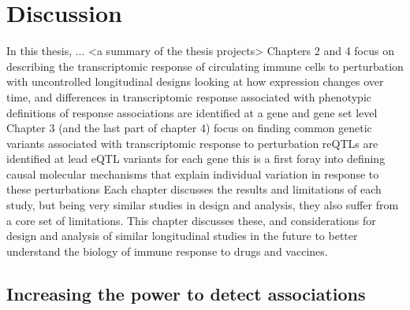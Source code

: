 %
%

\chapter{Discussion}
\label{ch:discussion}


\begin{outline}

\1 In this thesis, ... <a summary of the thesis projects>
    \2 Chapters 2 and 4 focus on describing the transcriptomic response of circulating immune cells to perturbation with uncontrolled longitudinal designs
        \3 looking at how expression changes over time, and differences in transcriptomic response associated with phenotypic definitions of response
        \3 associations are identified at a gene and gene set level
    \2 Chapter 3 (and the last part of chapter 4) focus on finding common genetic variants associated with transcriptomic response to perturbation
        \3 reQTLs are identified at lead eQTL variants for each gene
        \3 this is a first foray into defining causal molecular mechanisms that explain individual variation in response to these perturbations
    \2 Each chapter discusses the results and limitations of each study, but being very similar studies in design and analysis, they also suffer from a core set of limitations.
    \2 This chapter discusses these, and considerations for design and analysis of similar longitudinal studies in the future to better understand the biology of immune response to drugs and vaccines.

\section{Increasing the power to detect associations}


\end{outline}
